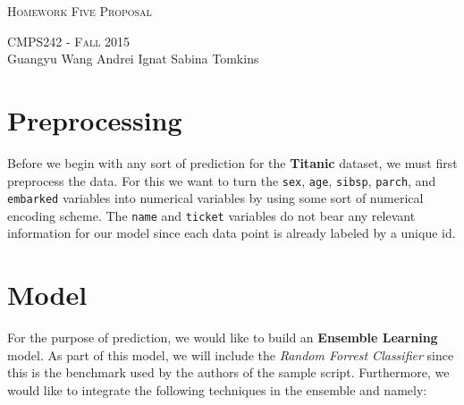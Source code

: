 \documentclass{article}
\begin{document}
\begin{center}
\Huge{\textsc{Homework Five Proposal}} 

\Large\textsc{CMPS242 - Fall 2015}\\

\large{Guangyu Wang \hfill Andrei Ignat  \hfill Sabina Tomkins} 
\end{center}

\section*{Preprocessing}
Before we begin with any sort of prediction for the \textbf{Titanic} dataset, we must first preprocess the data. For this we want to turn the \texttt{sex}, \texttt{age}, \texttt{sibsp}, \texttt{parch}, and \texttt{embarked} variables into numerical variables by using some sort of numerical encoding scheme. The \texttt{name} and \texttt{ticket} variables do not bear any relevant information for our model since each data point is already labeled by a unique id.


\section*{Model}
For the purpose of prediction, we would like to build an \textbf{Ensemble Learning} model. As part of this model, we will include the \textit{Random Forrest Classifier} since this is the benchmark used by the authors of the sample script. Furthermore, we would like to integrate the following techniques in the ensemble and namely:
\end{document}
